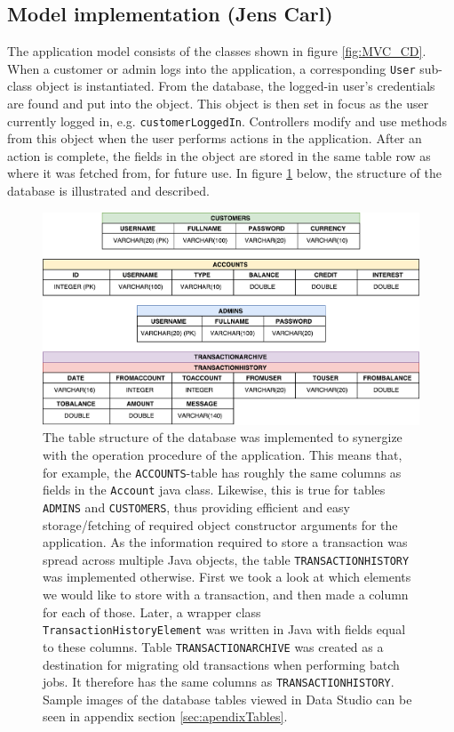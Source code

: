\subsection{Model implementation (Jens Carl)}
The application model consists of the classes shown in figure \ref{fig:MVC_CD}. When a customer or admin logs into the application, a corresponding \texttt{User} sub-class object is instantiated. From the database, the logged-in user's credentials are found and put into the object. This object is then set in focus as the user currently logged in, e.g. \texttt{customerLoggedIn}. Controllers modify and use methods from this object when the user performs actions in the application. After an action is complete, the fields in the object are stored in the same table row as where it was fetched from, for future use. In figure \ref{fig:dbTables} below, the structure of the database is illustrated and described. 

\begin{figure}[H]
    \centering
    \includegraphics[width = 1.0\textwidth]{figures/dbTables.pdf}
    \caption{The table structure of the database was implemented to synergize with the operation procedure of the application. This means that, for example, the \texttt{ACCOUNTS}-table has roughly the same columns as fields in the \texttt{Account} java class. Likewise, this is true for tables \texttt{ADMINS} and \texttt{CUSTOMERS}, thus providing efficient and easy storage/fetching of required object constructor arguments for the application. 
    As the information required to store a transaction was spread across multiple Java objects, the table \texttt{TRANSACTIONHISTORY} was implemented otherwise. First we took a look at which elements we would like to store with a transaction, and then made a column for each of those. Later, a wrapper class \texttt{TransactionHistoryElement} was written in Java with fields equal to these columns. Table \texttt{TRANSACTIONARCHIVE} was created as a destination for migrating old transactions when performing batch jobs. It therefore has the same columns as \texttt{TRANSACTIONHISTORY}. Sample images of the database tables viewed in Data Studio can be seen in appendix section \ref{sec:apendixTables}.}
    \label{fig:dbTables}
\end{figure}



